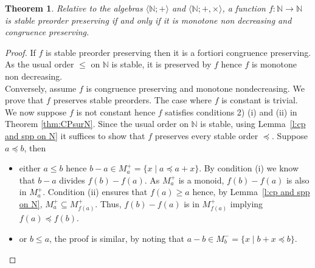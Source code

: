 \documentclass[11pt,a4paper]{article}
\newtheorem{theorem}{Theorem}[section]
\theoremstyle{definition} %
\newcommand\+[1]{\mathcal{#1}} %
\newcommand{\N}{{\mathbb N}}     %
\begin{document}
\begin{theorem}\label{prop:miracle}
Relative to the algebras $\langle\N;+\rangle$ and $\langle\N;+,\times\rangle$,
a function $f:\N\to\N$ is stable preorder preserving if and only if it is monotone non decreasing
and congruence preserving.
\end{theorem}

\begin{proof}
If $f$ is stable preorder preserving then it is a fortiori congruence preserving.
As the usual order $\leq$ on $\N$ is stable, it is preserved by $f$ hence $f$ is monotone non decreasing.\\
Conversely,
assume $f$ is congruence preserving and monotone nondecreasing.
We prove that $f$ preserves stable preorders.
The case where $f$ is constant is trivial. We now suppose $f$ is not constant hence
$f$ satisfies conditions 2) (i) and (ii) in  Theorem \ref{thm:CPsurN}.
Since the usual order on $\N$ is stable, using Lemma~\ref{l:cp and spp on N} it suffices
to show that $f$ preserves every stable order $\preceq$. 
 Suppose $a\preceq b$, then
\begin{itemize}\setlength{\itemsep}{0pt}
\item either  $a\leq b$ hence  $b-a\in M^+_a=\{x \mid a\preceq a+x\}$.
By condition (i) we know that $b-a$ divides $f(b)-f(a)$. 
As $M^+_a$ is a monoid, $f(b)-f(a)$ is also in $M^+_a$.
Condition (ii) ensures that $f(a)\geq a$ hence,  by Lemma~\ref{l:cp and spp on N},
$M^+_a \subseteq M^+_{f(a)}$. Thus, $f(b)-f(a)$ is in $M^+_{f(a)}$
implying $f(a)\preceq f(b)$. 
\item or $b\leq a$, the proof is similar, by noting that $a-b\in
M^-_b=\{x \mid b+x\preceq b\}$.\qedhere
\end{itemize}
\end{proof}
%
\end{document}
